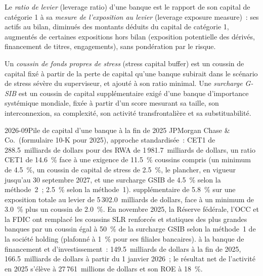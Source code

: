 \begin{definition}\label{def:fm:the-bank-markets-division:lr}
Le \emph{ratio de levier} (leverage ratio) d'une banque est le rapport de son capital de catégorie 1 à sa
\emph{mesure de l'exposition au levier} (leverage exposure measure)~: ses actifs au bilan, diminués des montants déduits du capital de catégorie 1, augmentés de certaines expositions hors bilan (exposition
potentielle des dérivés, financement de titres, engagements), sans pondération par le risque.
\end{definition}

\begin{definition}\label{def:fm:the-bank-markets-division:buffers}
Un \emph{coussin de fonds propres de stress} (stress capital buffer) est un coussin de capital fixé à partir de la perte de capital qu'une banque subirait dans le scénario de stress sévère
du superviseur, et ajouté à son ratio minimal. Une \emph{surcharge G-SIB} est un coussin de capital supplémentaire exigé
d'une banque d'importance systémique mondiale, fixée à partir d'un score mesurant sa taille, son interconnexion, sa complexité, son activité transfrontalière et
sa substituabilité.
\end{definition}

\begin{dated}{2026-09}{Pile de capital d'une banque à la fin de 2025}\label{dat:fm:the-bank-markets-division:jpm}
JPMorgan Chase \& Co.\ (formulaire 10-K pour 2025), approche standardisée~:  CET1 de 288.5~milliards de dollars pour des RWA de 1\,981.7~milliards de dollars, un ratio CET1 de
14.6~\% face à une exigence de 11.5~\% coussins compris (un minimum de 4.5~\%, un coussin de capital de stress de 2.5~\%, le plancher, en vigueur
jusqu'au 30 septembre 2027, et une surcharge GSIB de 4.5~\% selon la méthode~2~; 2.5~\% selon la méthode~1).  supplémentaire de 5.8~\% sur une exposition totale au levier
de 5\,302.0~milliards de dollars, face à un minimum de 3.0~\% plus un coussin de 2.0~\%. En novembre 2025, la Réserve fédérale, l'OCC et la FDIC ont remplacé les
coussins SLR renforcés et statiques des plus grandes banques par un coussin égal à 50~\% de la surcharge GSIB selon la méthode~1 de la société holding (plafonné à 1~\% pour ses
filiales bancaires).  à la banque de financement et d'investissement~: 149.5~milliards de dollars à la fin de 2025, 166.5~milliards de dollars à partir du 1 janvier 2026~;
le résultat net de l'activité en 2025 s'élève à 27\,761~millions de dollars et son ROE à 18~\%.
\end{dated}

